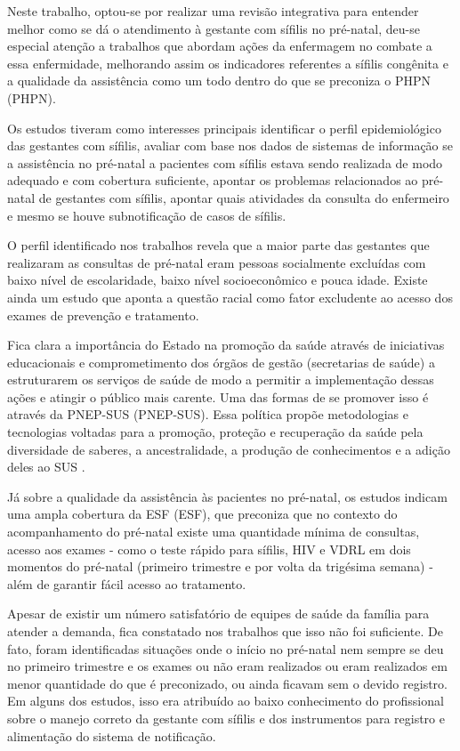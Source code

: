 Neste trabalho, optou-se por realizar uma revisão integrativa para entender melhor como se dá o atendimento à gestante com sífilis no pré-natal, deu-se especial atenção a trabalhos que abordam ações da enfermagem no combate a essa enfermidade, melhorando assim os indicadores referentes a sífilis congênita e a qualidade da assistência como um todo dentro do que se preconiza o \acrlong{PHPN} (\acrshort{PHPN}).

Os estudos tiveram como interesses principais identificar o perfil epidemiológico das gestantes com sífilis, avaliar com base nos dados de sistemas de informação se a assistência no pré-natal a pacientes com sífilis estava sendo realizada de modo adequado e com cobertura suficiente, apontar os problemas relacionados ao pré-natal de gestantes com sífilis, apontar quais atividades da consulta do enfermeiro e mesmo se houve subnotificação de casos de sífilis. 

O perfil identificado nos trabalhos revela que a maior parte das gestantes que realizaram as consultas de pré-natal eram pessoas socialmente excluídas com baixo nível de escolaridade, baixo nível socioeconômico e pouca idade. Existe ainda um estudo que aponta a questão racial como fator excludente ao acesso dos exames de prevenção e tratamento. \cite{dos2010assistencia,suto2016assistencia,tavares2012monitoramento,da2013sifilis}

Fica clara a importância do Estado na promoção da saúde através de iniciativas educacionais e comprometimento dos órgãos de gestão (secretarias de saúde) a estruturarem os serviços de saúde de modo a permitir a implementação dessas ações e atingir o público mais carente. Uma das formas de se promover isso é através da \acrlong{PNEP-SUS} (\acrshort{PNEP-SUS}). Essa política propõe metodologias e tecnologias voltadas para a promoção, proteção e recuperação da saúde pela diversidade de saberes, a ancestralidade, a produção de conhecimentos e a adição deles ao SUS \cite{vasconcelos1999educaccao}.

Já sobre a qualidade da assistência às pacientes no pré-natal, os estudos indicam uma ampla cobertura da \acrlong{ESF} (\acrshort{ESF}), que preconiza que no contexto do acompanhamento do pré-natal existe uma quantidade mínima de consultas, acesso aos exames - como o teste rápido para sífilis, \acrshort{HIV} e \acrshort{VDRL} em dois momentos do pré-natal (primeiro trimestre e por volta da trigésima semana) - além de garantir fácil acesso ao tratamento.

Apesar de existir um número satisfatório de equipes de saúde da família para atender a demanda, fica constatado nos trabalhos que isso não foi suficiente. De fato, foram identificadas situações onde o início no pré-natal nem sempre se deu no primeiro trimestre e os exames ou não eram realizados ou eram realizados em menor quantidade do que é preconizado, ou ainda ficavam sem o devido registro. Em alguns dos estudos, isso era atribuído ao baixo conhecimento do profissional sobre o manejo correto da gestante com sífilis e dos instrumentos para registro e alimentação do sistema de notificação. \cite{tavares2012monitoramento,da2013sifilis,da2013sifilis}

